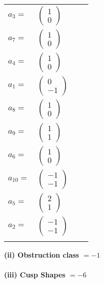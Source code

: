 \documentclass[1p]{elsarticle_modified}
\theoremstyle{definition}
\begin{document}
\begin{tabular}{m{7pt} m{180pt} m{7pt} m{180pt} }
\flushright $a_{3}=$&$\begin{pmatrix}1\\0\end{pmatrix}$ \\
\flushright $a_{7}=$&$\begin{pmatrix}1\\0\end{pmatrix}$ \\
\flushright $a_{4}=$&$\begin{pmatrix}1\\0\end{pmatrix}$ \\
\flushright $a_{1}=$&$\begin{pmatrix}0\\-1\end{pmatrix}$ \\
\flushright $a_{8}=$&$\begin{pmatrix}1\\0\end{pmatrix}$ \\
\flushright $a_{9}=$&$\begin{pmatrix}1\\1\end{pmatrix}$ \\
\flushright $a_{6}=$&$\begin{pmatrix}1\\0\end{pmatrix}$ \\
\flushright $a_{10}=$&$\begin{pmatrix}-1\\-1\end{pmatrix}$ \\
\flushright $a_{5}=$&$\begin{pmatrix}2\\1\end{pmatrix}$ \\
\flushright $a_{2}=$&$\begin{pmatrix}-1\\-1\end{pmatrix}$\\&\end{tabular}
\flushleft \textbf{(ii) Obstruction class $= -1$}\\~\\
\flushleft \textbf{(iii) Cusp Shapes $= -6$}\\~\\
\end{document}

